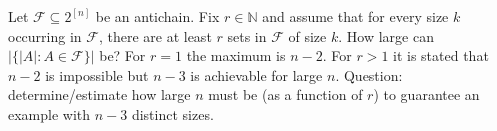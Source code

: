 Let \(\mathcal{F}\subseteq 2^{[n]}\) be an antichain.
Fix \(r\in\mathbb{N}\) and assume that for every size \(k\) occurring in \(\mathcal{F}\), there are at least \(r\) sets in \(\mathcal{F}\) of size \(k\).
How large can \(|\{|A|:A\in\mathcal{F}\}|\) be?
For \(r=1\) the maximum is \(n-2\).
For \(r>1\) it is stated that \(n-2\) is impossible but \(n-3\) is achievable for large \(n\).
Question: determine/estimate how large \(n\) must be (as a function of \(r\)) to guarantee an example with \(n-3\) distinct sizes.
